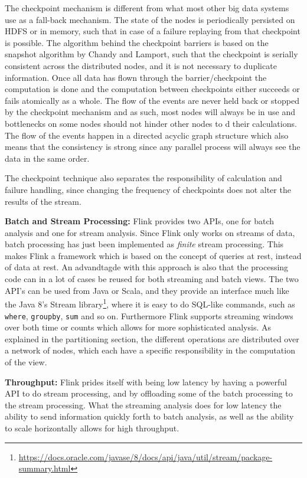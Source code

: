 The checkpoint mechanism is different from what most other big data systems use as a fall-back mechanism. The state of the nodes is periodically persisted on HDFS or in memory, such that in case of a failure replaying from that checkpoint is possible. The algorithm behind the checkpoint barriers is based on the snapshot algorithm by Chandy and Lamport\cite{data-artisan-flink}, such that the checkpoint is serially consistent across the distributed nodes, and it is not necessary to duplicate information. Once all data has flown through the barrier/checkpoint the computation is done and the computation between checkpoints either succeeds or fails atomically as a whole. The flow of the events are never held back or stopped by the checkpoint mechanism and as such, most nodes will always be in use and bottlenecks on some nodes should not hinder other nodes to d their calculations. The flow of the events happen in a directed acyclic graph structure which also means that the consistency is strong since any parallel process will always see the data in the same order\cite{data-artisan-flink}.

The checkpoint technique also separates the responsibility of calculation and failure handling, since changing the frequency of checkpoints does not alter the results of the stream.

\newpar \textbf{Batch and Stream Processing:} Flink provides two APIs, one for batch analysis and one for stream analysis. Since Flink only works on streams of data, batch processing has just been implemented as \textit{finite} stream processing. This makes Flink a framework which is based on the concept of queries at rest, instead of data at rest. An advandtagde with this approach is also that the processing code can in a lot of cases be reused for both streaming and batch views. The two API's can be used from Java or Scala, and they provide an interface much like the Java 8's Stream library\footnote{ \url{https://docs.oracle.com/javase/8/docs/api/java/util/stream/package-summary.html}}, where it is easy to do SQL-like commands, such as \texttt{where}, \texttt{groupby}, \texttt{sum} and so on. Furthermore Flink supports streaming windows over both time or counts which allows for more sophisticated analysis. As explained in the partitioning section, the different operations are distributed over a network of nodes, which each have a specific responsibility in the computation of the view.

\newpar \textbf{Throughput:} Flink prides itself with being low latency by having a powerful API to do stream processing, and by offloading some of the batch processing to the stream processing. What the streaming analysis does for low latency the ability to send information quickly forth to batch analysis, as well as the ability to scale horizontally allows for high throughput. 

